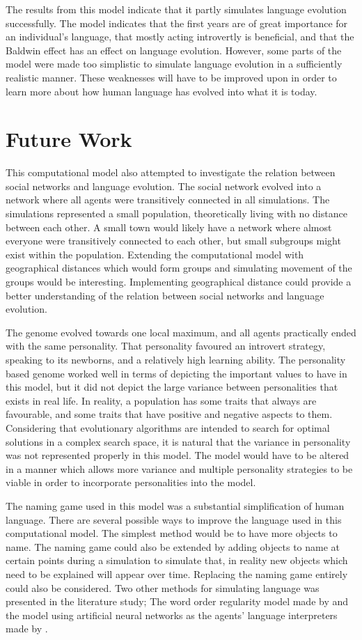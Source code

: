 The results from this model indicate that it partly simulates language evolution successfully. The model indicates that the first years are of great importance for an individual's language, that mostly acting introvertly is beneficial, and that the Baldwin effect has an effect on language evolution. However, some parts of the model were made too simplistic to simulate language evolution in a sufficiently realistic manner. These weaknesses will have to be improved upon in order to learn more about how human language has evolved into what it is today.
 
\section{Future Work}
This computational model also attempted to investigate the relation between social networks and language evolution. The social network evolved into a network where all agents were transitively connected in all simulations. The simulations represented a small population, theoretically living with no distance between each other. A small town would likely have a network where almost everyone were transitively connected to each other, but small subgroups might exist within the population. Extending the computational model with geographical distances which would form groups and simulating movement of the groups would be interesting. Implementing geographical distance could provide a better understanding of the relation between social networks and language evolution.
 
The genome evolved towards one local maximum, and all agents practically ended with the same personality. That personality favoured an introvert strategy, speaking to its newborns, and a relatively high learning ability. The personality based genome worked well in terms of depicting the important values to have in this model, but it did not depict the large variance between personalities that exists in real life.  In reality, a population has some traits that always are favourable, and some traits that have positive and negative aspects to them. Considering that evolutionary algorithms are intended to search for optimal solutions in a complex search space, it is natural that the variance in personality was not represented properly in this model. The model would have to be altered in a manner which allows more variance and multiple personality strategies to be viable in order to incorporate personalities into the model.  
 
The naming game used in this model was a substantial simplification of human language. There are several possible ways to improve the language used in this computational model. The simplest method would be to have more objects to name. The naming game could also be extended by adding objects to name at certain points during a simulation to simulate  that, in reality new objects which need to be explained will appear over time. Replacing the naming game entirely could also be considered. Two other methods for simulating language was presented in the literature study; The word order regularity model made by \citet{gong2004computational} and the model using artificial neural networks as the agents’ language interpreters made by \citet{munroe2002learning}.
